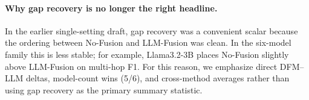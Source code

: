 \paragraph{Why gap recovery is no longer the right headline.}
In the earlier single-setting draft, gap recovery was a convenient scalar because the ordering between No-Fusion and LLM-Fusion was clean. In the six-model family this is less stable; for example, Llama3.2-3B places No-Fusion slightly above LLM-Fusion on multi-hop F1. For this reason, we emphasize direct DFM--LLM deltas, model-count wins (5/6), and cross-method averages rather than using gap recovery as the primary summary statistic.
